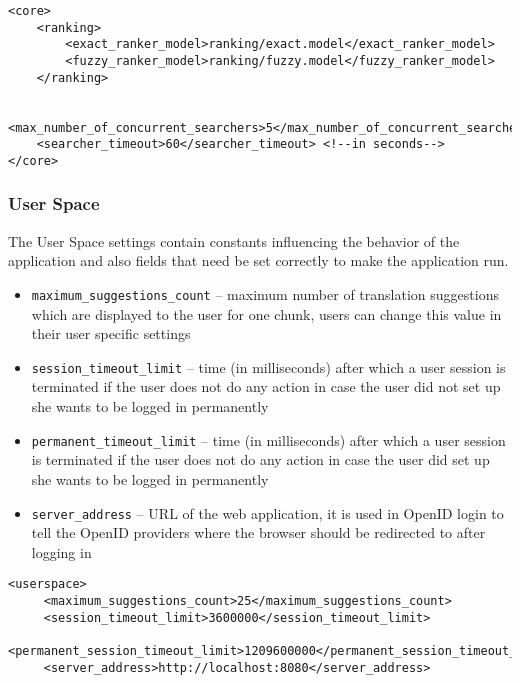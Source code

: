 \begin{lstlisting}
<core>
    <ranking>
        <exact_ranker_model>ranking/exact.model</exact_ranker_model>
        <fuzzy_ranker_model>ranking/fuzzy.model</fuzzy_ranker_model>
    </ranking>

    <max_number_of_concurrent_searchers>5</max_number_of_concurrent_searchers>
    <searcher_timeout>60</searcher_timeout> <!--in seconds-->
</core>

\end{lstlisting}

\subsubsection{User Space}
\label{subsec:user_scpace_settings}

The User Space settings contain constants influencing the behavior of the application and also fields that need be set correctly to make the application run.

\begin{itemize} 
\item \verb#maximum_suggestions_count# -- maximum number of translation suggestions which are displayed to the user for one chunk, users can change this value in their user specific settings
\item \verb#session_timeout_limit# -- time (in milliseconds) after which a user session is terminated if the user does not do any action in case the user did not set up she wants to be logged in permanently
\item \verb#permanent_timeout_limit# -- time (in milliseconds) after which a user session is terminated if the user does not do any action in case the user did set up she wants to be logged in permanently
\item \verb#server_address# -- URL of the web application, it is used in OpenID login to tell the OpenID providers where the browser should be redirected to after logging in

\end{itemize}

\begin{lstlisting}
<userspace>
     <maximum_suggestions_count>25</maximum_suggestions_count>
     <session_timeout_limit>3600000</session_timeout_limit>
     <permanent_session_timeout_limit>1209600000</permanent_session_timeout_limit>
     <server_address>http://localhost:8080</server_address>
\end{lstlisting}


